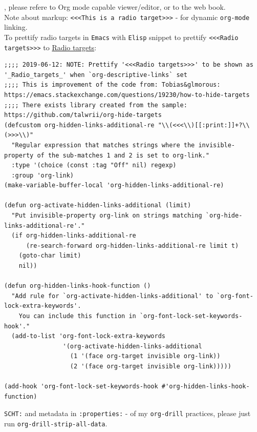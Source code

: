 \documentclass[a4paper,14pt,oneside]{book}
\begin{document}
, please refere to Org mode capable viewer/editor, or to the web book.\\

Note about markup: \texttt{<<<This is a radio target>>>} - for dynamic \texttt{org-mode} linking.\\

To prettify radio targets in \texttt{Emacs} with \texttt{Elisp} snippet to prettify \texttt{<<<Radio targets>>>} to \uline{Radio targets}:\\

\begin{verbatim}
;;;; 2019-06-12: NOTE: Prettify '<<<Radio targets>>>' to be shown as '_Radio_targets_' when `org-descriptive-links` set
;;;; This is improvement of the code from: Tobias&glmorous: https://emacs.stackexchange.com/questions/19230/how-to-hide-targets
;;;; There exists library created from the sample: https://github.com/talwrii/org-hide-targets
(defcustom org-hidden-links-additional-re "\\(<<<\\)[[:print:]]+?\\(>>>\\)"
  "Regular expression that matches strings where the invisible-property of the sub-matches 1 and 2 is set to org-link."
  :type '(choice (const :tag "Off" nil) regexp)
  :group 'org-link)
(make-variable-buffer-local 'org-hidden-links-additional-re)

(defun org-activate-hidden-links-additional (limit)
  "Put invisible-property org-link on strings matching `org-hide-links-additional-re'."
  (if org-hidden-links-additional-re
      (re-search-forward org-hidden-links-additional-re limit t)
    (goto-char limit)
    nil))

(defun org-hidden-links-hook-function ()
  "Add rule for `org-activate-hidden-links-additional' to `org-font-lock-extra-keywords'.
    You can include this function in `org-font-lock-set-keywords-hook'."
  (add-to-list 'org-font-lock-extra-keywords
                '(org-activate-hidden-links-additional
                  (1 '(face org-target invisible org-link))
                  (2 '(face org-target invisible org-link)))))

(add-hook 'org-font-lock-set-keywords-hook #'org-hidden-links-hook-function)
\end{verbatim}

\texttt{SCHT:} and metadata in \texttt{:properties:} - of my \texttt{org-drill} practices, please just run \texttt{org-drill-strip-all-data}.\\
\end{document}
